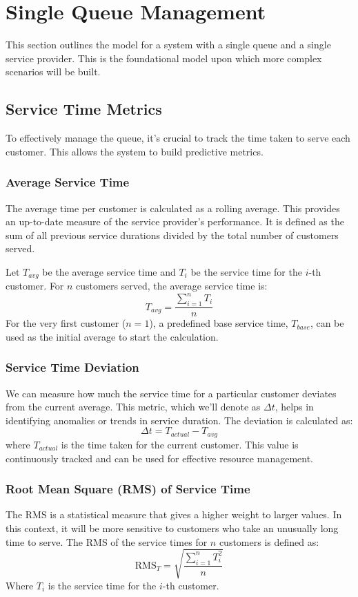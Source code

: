\documentclass{article}
\begin{document}
\section{Single Queue Management}

This section outlines the model for a system with a single queue and a single service provider. This is the foundational model upon which more complex scenarios will be built.

\subsection{Service Time Metrics}
To effectively manage the queue, it's crucial to track the time taken to serve each customer. This allows the system to build predictive metrics.

\subsubsection{Average Service Time}
The average time per customer is calculated as a rolling average. This provides an up-to-date measure of the service provider's performance. It is defined as the sum of all previous service durations divided by the total number of customers served.

Let $T_{avg}$ be the average service time and $T_i$ be the service time for the $i$-th customer. For $n$ customers served, the average service time is:
\begin{equation}
    T_{avg} = \frac{\sum_{i=1}^{n} T_i}{n}
\end{equation}
For the very first customer ($n=1$), a predefined base service time, $T_{base}$, can be used as the initial average to start the calculation.

\subsubsection{Service Time Deviation}
We can measure how much the service time for a particular customer deviates from the current average. This metric, which we'll denote as $\Delta t$, helps in identifying anomalies or trends in service duration. The deviation is calculated as:
\begin{equation}
    \Delta t = T_{actual} - T_{avg}
\end{equation}
where $T_{actual}$ is the time taken for the current customer. This value is continuously tracked and can be used for effective resource management.

\subsubsection{Root Mean Square (RMS) of Service Time}
The RMS is a statistical measure that gives a higher weight to larger values. In this context, it will be more sensitive to customers who take an unusually long time to serve. The RMS of the service times for $n$ customers is defined as:
\begin{equation}
    \text{RMS}_T = \sqrt{\frac{\sum_{i=1}^{n} T_i^2}{n}}
\end{equation}
Where $T_i$ is the service time for the $i$-th customer.
\end{document}

